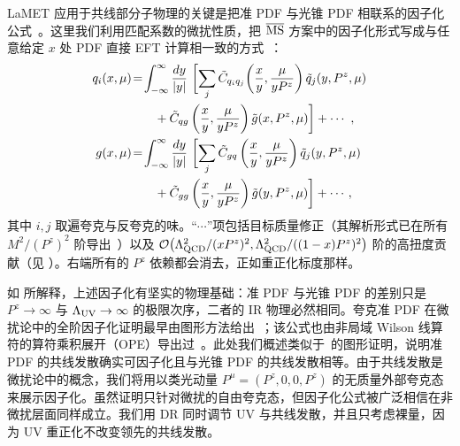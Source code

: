LaMET 应用于共线部分子物理的关键是把准 PDF 与光锥 PDF 相联系的因子化公式~\cite{Ji:2013dva}。这里我们利用匹配系数的微扰性质，把 ${\overline{\rm MS}}$ 方案中的因子化形式写成与任意给定 $x$ 处 PDF 直接 EFT 计算相一致的方式~\cite{Izubuchi:2018srq,Wang:2019tgg}：
\begin{align}
	q_i(x,  \mu)\! &=\! \int_{-\infty}^{\infty} \frac{dy}{|y|} \ \bigg[\!\sum_j \tilde C_{q_iq_j}\!\left(\frac{x}{y}, \frac{\mu}{yP^z}\right) \tilde{q}_j(y,P^z,\mu) \label{eq:factorization1} \\
	&\qquad + \tilde C_{qg}\left(\frac{x}{y}, \frac{\mu}{yP^z}\right) \tilde{g}(x,P^z,\mu)\bigg] + \cdots
	\ ,\nn\\
	g(x, \mu)\! &=\! \int_{-\infty}^{\infty} \frac{dy}{|y|} \ \bigg[\!\sum_j \tilde C_{gq}\left(\frac{x}{y}, \frac{\mu}{yP^z}\right) \tilde{q}_j(y,P^z,\mu) \label{eq:factorization2} \\
	&\qquad + \tilde C_{gg}\left(\frac{x}{y}, \frac{\mu}{yP^z}\right) \tilde{g}(y,P^z,\mu)\bigg] + \cdots\,,\nn
\end{align}
其中 $i,j$ 取遍夸克与反夸克的味。``$\cdots$''项包括目标质量修正（其解析形式已在所有 $M^2/(P^z)^2$ 阶导出~\cite{Chen:2016utp}）以及 ${\cal O}\big(\Lambda_{\text{QCD}}^2/ (xP^z)^2,\Lambda_{\text{QCD}}^2/ ((1-x)P^z)^2\big)$ 阶的高扭度贡献（见 ）。右端所有的 $P^z$ 依赖都会消去，正如重正化标度那样。

如  所解释，上述因子化有坚实的物理基础：准 PDF 与光锥 PDF 的差别只是 $P^z\to \infty$ 与 $\Lambda_{\rm UV}\to \infty$ 的极限次序，二者的 IR 物理必然相同。夸克准 PDF 在微扰论中的全阶因子化证明最早由图形方法给出~\cite{Ma:2014jla}；该公式也由非局域 Wilson 线算符的算符乘积展开（OPE）导出过~\cite{Izubuchi:2018srq,Ma:2017pxb,Wang:2019tgg}。此处我们概述类似于~\cite{Ma:2014jla}的图形证明，说明准 PDF 的共线发散确实可因子化且与光锥 PDF 的共线发散相等。由于共线发散是微扰论中的概念，我们将用以类光动量 $P^\mu=(P^z,0,0,P^z)$ 的无质量外部夸克态来展示因子化。虽然证明只针对微扰的自由夸克态，但因子化公式被广泛相信在非微扰层面同样成立。我们用 DR 同时调节 UV 与共线发散，并且只考虑裸量，因为 UV 重正化不改变领先的共线发散。

